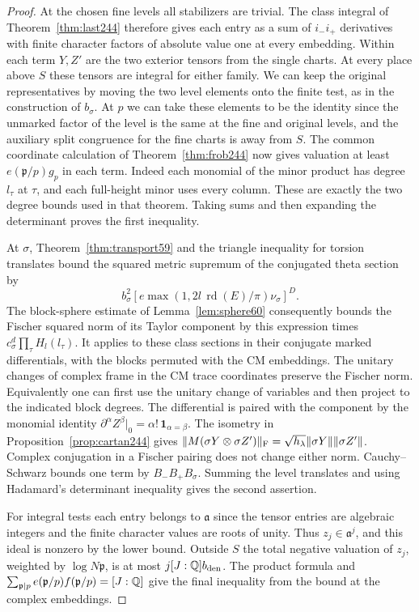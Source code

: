 \documentclass[a4paper,11pt]{article}
\theoremstyle{definition}
\theoremstyle{remark}
\numberwithin{equation}{section}
\begin{document}
\begin{proof}
At the chosen fine levels all stabilizers are trivial. The
class integral of Theorem~\ref{thm:last244} therefore gives
each entry as a sum of \(i_-i_+\) derivatives with finite
character factors of absolute value one at every embedding.
Within each term \(Y,Z'\) are the two exterior tensors from
the single charts. At every place above \(S\) these tensors
are integral for either family. We can keep the original
representatives by moving the two level elements onto the
finite test, as in the construction of \(b_\sigma\). At \(p\)
we can take these elements to be the identity since the unmarked
factor of the level is the same at the fine and original
levels, and the auxiliary split congruence for the fine
charts is away from \(S\). The common coordinate calculation
of Theorem~\ref{thm:frob244} now gives valuation at least
\(e(\mathfrak p/p)g_p\) in each term. Indeed each monomial
of the minor product has degree \(l_\tau\) at \(\tau\), and
each full-height minor uses every column. These are exactly
the two degree bounds used in that theorem. Taking sums and
then expanding the determinant proves the first inequality.

At \(\sigma\), Theorem~\ref{thm:transport59} and the triangle
inequality for torsion translates bound the squared metric
supremum of the conjugated theta section by
\[
        b_\sigma^2[e\max(1,2l\,\operatorname{rd}(E)/\pi)\nu_\sigma]^D .
\]
The block-sphere estimate of
Lemma~\ref{lem:sphere60} consequently bounds the Fischer
squared norm of its Taylor component by this expression
times \(c_\sigma^d\prod_\tau H_l(l_\tau)\). It applies to
these class sections in their conjugate marked differentials,
with the blocks permuted with the CM embeddings.
The unitary changes of complex frame in the
CM trace coordinates preserve the Fischer norm. Equivalently
one can first use the unitary change of variables and then
project to the indicated block degrees. The differential
is paired with the component by the monomial identity
\(\partial^\alpha Z^\beta|_0=\alpha!\,\mathbf1_{\alpha=\beta}\).
The isometry in Proposition~\ref{prop:cartan244} gives
\(\|M(\sigma Y\otimes\sigma Z')\|_{\rm F}
=\sqrt{h_\lambda}\|\sigma Y\|\|\sigma Z'\|\).
Complex conjugation in a Fischer pairing does not change
either norm. Cauchy--Schwarz bounds one term by
\(B_-B_+ B_\sigma\). Summing the level translates and using
Hadamard's determinant inequality gives the second assertion.

For integral tests each entry belongs to \(\mathfrak a\)
since the tensor entries are algebraic integers and the finite
character values are roots of unity. Thus \(z_j\in\mathfrak a^j\),
and this ideal is nonzero by the lower bound. Outside \(S\)
the total negative valuation of \(z_j\), weighted by
\(\log N\mathfrak p\), is at most \(j[J:\mathbb Q]b_{\rm den}\).
The product formula and \(\sum_{\mathfrak p\mid p}
e(\mathfrak p/p)f(\mathfrak p/p)=[J:\mathbb Q]\) give the final
inequality from the bound at the complex embeddings.
\end{proof}
\end{document}
